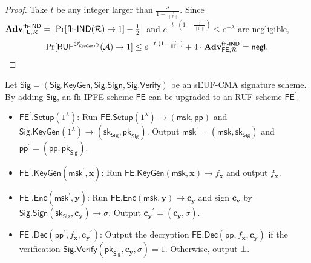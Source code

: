 \begin{proof}
\noindent Take $t$ be any integer larger than $\frac{\lambda}{ 1 - \frac{\gamma}{\| \mathbb{F} \| }}$. Since $\mathbf{Adv}_{\textsf{FE}, \mathcal{R}}^\textsf{fh-IND} = \left| \Pr[\textsf{fh-IND}(\mathcal{R}) \to 1] - \frac{1}{2} \right|$ and $e^{-t \cdot (1 - \frac{\gamma}{\| \mathbb{F} \|}) } \leq e^{-\lambda}$ are negligible,
\[
	\Pr[ \textsf{RUF}^{\mathcal{O}^\prime_{\textsf{KeyGen}}, \gamma}(\mathcal{A}) \to 1]  \leq e^{- t \cdot (1 - \frac{\gamma}{\| \mathbb{F} \|}) } + 4 \cdot \mathbf{Adv}_{\textsf{FE}, \mathcal{R}}^\textsf{fh-IND}  = \mathsf{negl}.
\]

\end{proof}


Let $\textsf{Sig} = ( \textsf{Sig.KeyGen}, \textsf{Sig.Sign}, \textsf{Sig.Verify} )$ be an sEUF-CMA signature scheme. By adding $\textsf{Sig}$, an fh-IPFE scheme $\textsf{FE}$ can be upgraded to an RUF scheme $\textsf{FE}^\prime$. 

\begin{itemize}

	\item $\textsf{FE}^\prime \textsf{.Setup}(1^\lambda)$: Run $\textsf{FE.Setup}(1^\lambda) \to (\textsf{msk}, \textsf{pp})$ and $\textsf{Sig.KeyGen}(1^\lambda) \to (\textsf{sk}_{\textsf{Sig}}, \textsf{pk}_{\textsf{Sig}} )$. Output $\textsf{msk}^\prime = (\textsf{msk}, \textsf{sk}_\textsf{Sig})$ and $\textsf{pp}^\prime = (\textsf{pp}, \textsf{pk}_{\textsf{Sig}})$.

	\item $\textsf{FE}^\prime \textsf{.KeyGen}(\textsf{msk}^\prime, \mathbf{x})$: Run $\textsf{FE.KeyGen}(\textsf{msk}, \mathbf{x}) \to f_\mathbf{x}$ and output $f_\mathbf{x}$.

	\item $\textsf{FE}^\prime \textsf{.Enc}(\textsf{msk}^\prime, \mathbf{y})$: Run $\textsf{FE.Enc}(\textsf{msk}, \mathbf{y}) \to \mathbf{c_y}$ and sign $\mathbf{c_y}$ by $\textsf{Sig.Sign}(\textsf{sk}_{\textsf{Sig}}, \mathbf{c_y}) \to \sigma$. Output $\mathbf{c_y}^\prime = (\mathbf{c_y}, \sigma)$.

	\item $\textsf{FE}^\prime \textsf{.Dec}(\textsf{pp}^\prime, f_\mathbf{x}, \mathbf{c_y}^\prime )$: Output the decryption $\textsf{FE.Dec}(\textsf{pp}, f_\mathbf{x}, \mathbf{c_y})$ if the verification $\textsf{Sig.Verify}(\textsf{pk}_{\textsf{Sig}}, \mathbf{c_y}, \sigma ) = 1$. Otherwise, output $\bot$.

\end{itemize}

